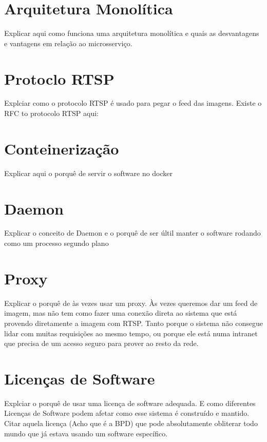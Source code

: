 \documentclass[12pt, %
openright, 
oneside, %
a4paper,    %
brazil]{facom-ufu-abntex2}
\begin{document}
\section{Arquitetura Monolítica}

Explicar aqui como funciona uma arquitetura monolítica e quais as desvantagens
e vantagens em relação ao microsserviço.

\section{Protoclo RTSP}

Explciar como o protocolo RTSP é usado para pegar o feed das imagens. Existe o
RFC to protocolo RTSP aqui:

\section{Conteinerização}

Explicar aqui o porquê de servir o software no docker

\section{Daemon}

Explicar o conceito de Daemon e o porquê de ser últil manter o software rodando
como um processo segundo plano

\section{Proxy}

Explicar o porquê de às vezes usar um proxy. Às vezes queremos dar um feed de
imagem, mas não tem como fazer uma conexão direta ao sistema que está provendo
diretamente a imagem com RTSP. Tanto porque o sistema não consegue lidar com
muitas requisições ao mesmo tempo, ou porque ele está numa intranet que precisa
de um acesso seguro para prover ao resto da rede.

\section{Licenças de Software}

Explciar o porquê de usar uma licença de software adequada. E como diferentes
Licenças de Software podem afetar como esse sistema é construído e mantido.
Citar aquela licença (Acho que é a BPD) que pode absolutamente obliterar todo
mundo que já estava usando um software específico.
\end{document}
